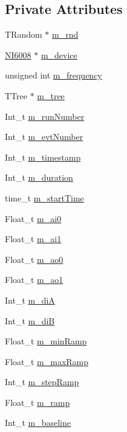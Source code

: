 \subsection*{Private Attributes}
\begin{DoxyCompactItemize}
\item 
T\+Random $\ast$ \hyperlink{classADCMeasurement_acdced9621e4b56d6772b8b34060b0a9d}{m\+\_\+rnd}
\item 
\hyperlink{classNI6008}{N\+I6008} $\ast$ \hyperlink{classADCMeasurement_afc825cc28b05894a0f762452459988e1}{m\+\_\+device}
\item 
unsigned int \hyperlink{classADCMeasurement_ab4a0653cc015ddf9b33b877c1d43b260}{m\+\_\+frequency}
\item 
T\+Tree $\ast$ \hyperlink{classADCMeasurement_ac218556f79d8a0533b292e96347ccd29}{m\+\_\+tree}
\item 
Int\+\_\+t \hyperlink{classADCMeasurement_aba8bc92a86954118babdc49b612a2412}{m\+\_\+run\+Number}
\item 
Int\+\_\+t \hyperlink{classADCMeasurement_ae21dcb1aeff71570c870648839a0c914}{m\+\_\+evt\+Number}
\item 
Int\+\_\+t \hyperlink{classADCMeasurement_a1fa77f5df72a81eab7e55e97d4bea27f}{m\+\_\+timestamp}
\item 
Int\+\_\+t \hyperlink{classADCMeasurement_a92c0ee7d148bb63de876817f624d1527}{m\+\_\+duration}
\item 
time\+\_\+t \hyperlink{classADCMeasurement_a5c2c98ec69e2331906b0eb41a826508e}{m\+\_\+start\+Time}
\item 
Float\+\_\+t \hyperlink{classADCMeasurement_a97ab811c2ef605184b78593cedea275b}{m\+\_\+ai0}
\item 
Float\+\_\+t \hyperlink{classADCMeasurement_ada963374f6f42db11aef7dbc239ce9fb}{m\+\_\+ai1}
\item 
Float\+\_\+t \hyperlink{classADCMeasurement_a45354a95e055970da767ffe534a0d798}{m\+\_\+ao0}
\item 
Float\+\_\+t \hyperlink{classADCMeasurement_a149349cc87061e2604b9e021aa63ee8c}{m\+\_\+ao1}
\item 
Int\+\_\+t \hyperlink{classADCMeasurement_ae024ec8553b7ea765af8668ab5e95699}{m\+\_\+diA}
\item 
Int\+\_\+t \hyperlink{classADCMeasurement_a9d04a602dda58b9fd65acf4a0a7de9a3}{m\+\_\+diB}
\item 
Float\+\_\+t \hyperlink{classADCMeasurement_ab015017d6a05ac4711836ceb1e072a85}{m\+\_\+min\+Ramp}
\item 
Float\+\_\+t \hyperlink{classADCMeasurement_a5e1f799c05f5781004a9081c4064e4a8}{m\+\_\+max\+Ramp}
\item 
Int\+\_\+t \hyperlink{classADCMeasurement_aa73b7cbd45e13df16291ff740f6140fe}{m\+\_\+step\+Ramp}
\item 
Float\+\_\+t \hyperlink{classADCMeasurement_ac84ed2ba70f38e73ec0eec1de65bbdca}{m\+\_\+ramp}
\item 
Int\+\_\+t \hyperlink{classADCMeasurement_aba7433a9e637389cc5425d036867a08f}{m\+\_\+baseline}
\end{DoxyCompactItemize}
